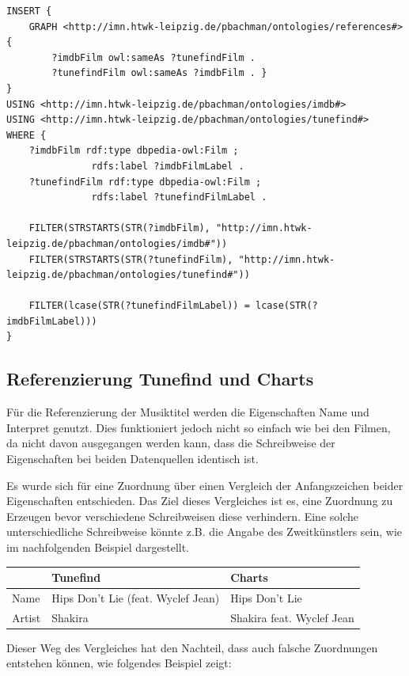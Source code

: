 \documentclass[parskip]{scrartcl}
\begin{document}
\begin{lstlisting}[caption={SPARQL-Query zur Referenzierung von Tunefind und IMDb}, label={lst:refTunefindImdb}]
INSERT {
    GRAPH <http://imn.htwk-leipzig.de/pbachman/ontologies/references#> { 
        ?imdbFilm owl:sameAs ?tunefindFilm .
        ?tunefindFilm owl:sameAs ?imdbFilm . }
}
USING <http://imn.htwk-leipzig.de/pbachman/ontologies/imdb#>
USING <http://imn.htwk-leipzig.de/pbachman/ontologies/tunefind#>
WHERE {
    ?imdbFilm rdf:type dbpedia-owl:Film ;
               rdfs:label ?imdbFilmLabel .
    ?tunefindFilm rdf:type dbpedia-owl:Film ;
               rdfs:label ?tunefindFilmLabel .
    
    FILTER(STRSTARTS(STR(?imdbFilm), "http://imn.htwk-leipzig.de/pbachman/ontologies/imdb#"))
    FILTER(STRSTARTS(STR(?tunefindFilm), "http://imn.htwk-leipzig.de/pbachman/ontologies/tunefind#"))
    
    FILTER(lcase(STR(?tunefindFilmLabel)) = lcase(STR(?imdbFilmLabel)))
}
\end{lstlisting}

\subsection{Referenzierung Tunefind und Charts}
Für die Referenzierung der Musiktitel werden die Eigenschaften Name und Interpret genutzt. Dies funktioniert jedoch nicht so einfach wie bei den Filmen, da nicht davon ausgegangen werden kann, dass die Schreibweise der Eigenschaften bei beiden Datenquellen identisch ist.

Es wurde sich für eine Zuordnung über einen Vergleich der Anfangszeichen beider Eigenschaften entschieden. Das Ziel dieses Vergleiches ist es, eine Zuordnung zu Erzeugen bevor verschiedene Schreibweisen diese verhindern. Eine solche unterschiedliche Schreibweise könnte z.B. die Angabe des Zweitkünstlers sein, wie im nachfolgenden Beispiel dargestellt.

\begin{tabular}{p{}|p{}|p{}}
     & \textbf{Tunefind} & \textbf{Charts} \\\hline
    Name & Hips Don't Lie (feat. Wyclef Jean)  & Hips Don't Lie\\
    Artist & Shakira & Shakira feat. Wyclef Jean\\
\end{tabular}

Dieser Weg des Vergleiches hat den Nachteil, dass auch falsche Zuordnungen entstehen können, wie folgendes Beispiel zeigt:
\end{document}
